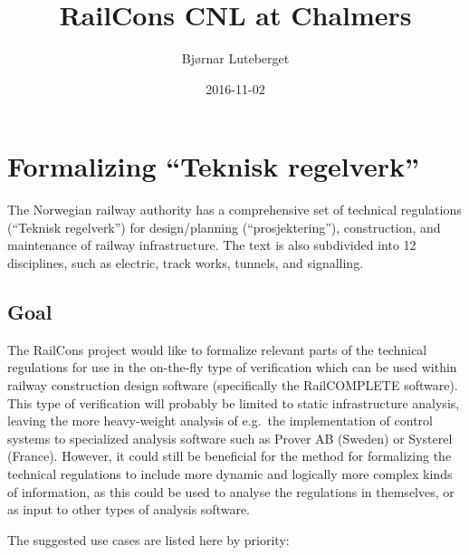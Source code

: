 \documentclass[]{article}
\title{RailCons CNL at Chalmers}
\author{Bjørnar Luteberget}
\date{2016-11-02}
\begin{document}
\maketitle

\section{\texorpdfstring{Formalizing ``Teknisk
regelverk''}{Formalizing Teknisk regelverk}}\label{formalizing-teknisk-regelverk}

The Norwegian railway authority has a comprehensive set of technical
regulations (``Teknisk regelverk'') for design/planning
(``prosjektering''), construction, and maintenance of railway
infrastructure. The text is also subdivided into 12 disciplines, such as
electric, track works, tunnels, and signalling.

\subsection{Goal}\label{goal}

The RailCons project would like to formalize relevant parts of the
technical regulations for use in the on-the-fly type of verification
which can be used within railway construction design software
(specifically the RailCOMPLETE software). This type of verification will
probably be limited to static infrastructure analysis, leaving the more
heavy-weight analysis of e.g.~the implementation of control systems to
specialized analysis software such as Prover AB (Sweden) or Systerel
(France). However, it could still be beneficial for the method for
formalizing the technical regulations to include more dynamic and
logically more complex kinds of information, as this could be used to
analyse the regulations in themselves, or as input to other types of
analysis software.

The suggested use cases are listed here by priority:
\end{document}
